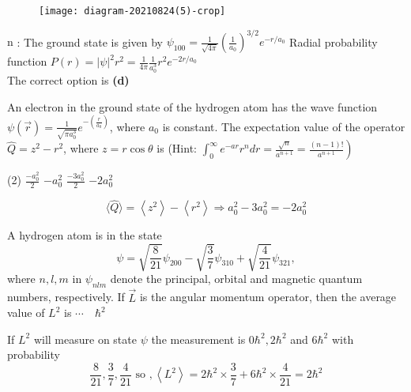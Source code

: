 \begin{enumerate}
\begin{tasks}
\begin{figure}[H]
		\end{figure}
		\task[\textbf{D.}]\begin{figure}[H]
			\centering
			\texttt{[image: diagram-20210824(5)-crop]}
		\end{figure}
	\end{tasks}
	\begin{answer}
		$\mathrm{n}$ : The ground state is given by $\psi_{100}=\frac{1}{\sqrt{4 \pi}}\left(\frac{1}{a_{0}}\right)^{3 / 2} e^{-r / a_{0}}$ Radial probability function $P(r)=|\psi|^{2} r^{2}=\frac{1}{4 \pi} \frac{1}{a_{0}^{3}} r^{2} e^{-2 r / a_{0}}$\\
		The correct option is \textbf{(d)}
	\end{answer}
	\begin{minipage}{\textwidth}
		\item An electron in the ground state of the hydrogen atom has the wave function $\psi(\vec{r})=\frac{1}{\sqrt{\pi a_{0}^{3}}} e^{-\left(\frac{r}{a_{0}}\right)}$, where $a_{0}$ is constant. The expectation value of the operator $\hat{Q}=z^{2}-r^{2}$, where $z=r \cos \theta$ is
		(Hint: $\left.\int_{0}^{\infty} e^{-a r} r^{n} d r=\frac{\sqrt{n}}{a^{n+1}}=\frac{(n-1) !}{a^{n+1}}\right)$
	\end{minipage}
	\begin{tasks}(2)
		\task[\textbf{A.}] $\frac{-a_{0}^{2}}{2}$
		\task[\textbf{B.}]$-a_{0}^{2}$
		\task[\textbf{C.}]$\frac{-3 a_{0}^{2}}{2}$
		\task[\textbf{D.}]$-2 a_{0}^{2}$
	\end{tasks}
	\begin{answer}
		$$\langle\hat{Q}\rangle=\left\langle z^{2}\right\rangle-\left\langle r^{2}\right\rangle \Rightarrow a_{0}^{2}-3 a_{0}^{2}=-2 a_{0}^{2}$$	
	\end{answer}
	\begin{minipage}{\textwidth}
		\item A hydrogen atom is in the state
		$$
		\psi=\sqrt{\frac{8}{21}} \psi_{200}-\sqrt{\frac{3}{7}} \psi_{310}+\sqrt{\frac{4}{21}} \psi_{321},
		$$
		where $n, l, m$ in $\psi_{n l m}$ denote the principal, orbital and magnetic quantum numbers, respectively. If $\vec{L}$ is the angular momentum operator, then the average value of $L^{2}$ is $\cdots \quad \hbar^{2}$
	\end{minipage}
	\begin{answer}
		If $L^{2}$ will measure on state $\psi$ the measurement is $0 \hbar^{2}, 2 \hbar^{2}$ and $6 \hbar^{2}$ with probability
		$$
		\frac{8}{21}, \frac{3}{7}, \frac{4}{21} \text { so },\left\langle L^{2}\right\rangle=2 \hbar^{2} \times \frac{3}{7}+6 \hbar^{2} \times \frac{4}{21}=2 \hbar^{2}
$$
\end{answer}
\end{enumerate}

